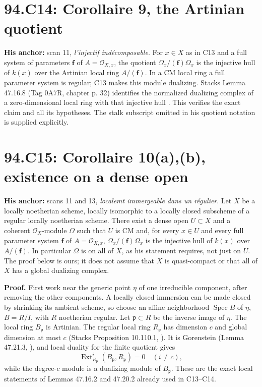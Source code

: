 \documentclass[11pt]{article}
\newcommand{\Ext}{\operatorname{Ext}}
\begin{document}
\section{94.C14: Corollaire 9, the Artinian quotient}
\label{C14}
\textbf{His anchor:} scan 11, \emph{l'injectif ind\'ecomposable}.
For $x\in X$ as in C13 and a full system of parameters $\mathbf f$
of $A=\mathcal O_{X,x}$, the quotient
$\Omega_x/(\mathbf f)\Omega_x$ is the injective hull of $k(x)$ over
the Artinian local ring $A/(\mathbf f)$.
In a CM local ring a full parameter system is regular; C13 makes
this module dualizing. Stacks Lemma 47.16.8 (Tag 0A7R, chapter p. 32)
identifies the normalized dualizing complex of a zero-dimensional
local ring with that injective hull \cite{StacksDualizingLocal}.
This verifies the exact claim and all its hypotheses. The stalk
subscript omitted in his quotient notation is supplied explicitly.

\section{94.C15: Corollaire 10(a),(b), existence on a dense open}
\label{C15}
\textbf{His anchor:} scans 11 and 13, \emph{localemt immergeable dans un r\'egulier}.
Let $X$ be a locally noetherian scheme, locally isomorphic to a locally
closed subscheme of a regular locally noetherian scheme. There exist a
dense open $U\subset X$ and a coherent $\mathcal O_X$-module $\Omega$
such that $U$ is CM and, for every $x\in U$ and every full parameter
system $\mathbf f$ of $A=\mathcal O_{X,x}$,
$\Omega_x/(\mathbf f)\Omega_x$ is the injective hull of $k(x)$ over
$A/(\mathbf f)$. In particular $\Omega$ is on all of $X$, as his
statement requires, not just on $U$. The proof below is ours; it does
not assume that $X$ is quasi-compact or that all of $X$ has a global
dualizing complex.

\textbf{Proof.} First work near the generic point $\eta$ of one
irreducible component, after removing the other components. A locally
closed immersion can be made closed by shrinking its ambient scheme,
so choose an affine neighborhood $\operatorname{Spec}B$ of $\eta$,
$B=R/I$, with $R$ noetherian regular. Let $\mathfrak p\subset R$ be
the inverse image of $\eta$. The local ring $B_{\mathfrak p}$ is
Artinian. The regular local ring $R_{\mathfrak p}$ has dimension $c$
and global dimension at most $c$ (Stacks Proposition 10.110.1,
\cite{StacksRegularResolution}).
It is Gorenstein (Lemma 47.21.3, \cite{StacksRegularGorenstein}), and local duality for the finite
quotient gives
\[
 \Ext^i_{R_{\mathfrak p}}(B_{\mathfrak p},R_{\mathfrak p})=0
 \quad(i\ne c),
\]
while the degree-$c$ module is a dualizing module of $B_{\mathfrak p}$.
These are the exact local statements of Lemmas 47.16.2 and 47.20.2
already used in C13--C14.
\end{document}
